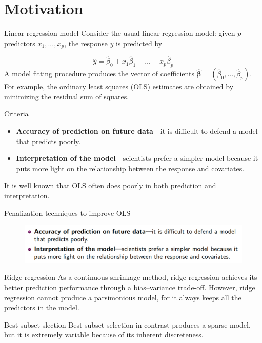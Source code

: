 \section{Motivation}
    \begin{frame}{Linear regression model}
    Consider the usual linear regression model: given $p$ predictors $x_1,..., x_p$, the response $y$ is predicted by
    
    \begin{equation}
\hat{y} = \hat{\beta}_0 + x_1\hat{\beta}_1 + \ldots + x_p\hat{\beta}_p
\end{equation}
\vspace{10pt}
A model fitting procedure produces the vector of coefficients $\hat{\boldsymbol{\beta}}=\left(\hat{\beta}_0,...,\hat{\beta}_p\right)$. For example, the ordinary least squares (OLS) estimates are obtained by minimizing the residual sum of squares.
    \end{frame}

    \begin{frame}{Criteria}
        \begin{itemize}
            \item \textbf{Accuracy of prediction on future data}—it is difficult to defend a model that predicts poorly.
            \item \textbf{Interpretation of the model}—scientists prefer a simpler model because it puts more light on the relationship between the response and covariates.
        \end{itemize}
        \vspace{10pt}
        It is well known that OLS often does poorly in both prediction and interpretation.
    \end{frame}

    \begin{frame}{Penalization techniques to improve OLS}
    
    \begin{figure}
        \centering
        \includegraphics[width=1\textwidth]{img/image4.png}
    \end{figure}
    
    \begin{block}{Ridge regression}
     As a continuous shrinkage method, ridge regression achieves its better prediction performance through a bias–variance trade-off. However, ridge regression cannot produce a parsimonious model, for it always keeps all the predictors in the model.
    \end{block}
    
     \begin{block}{Best subset slection}
         Best subset selection in contrast produces a sparse model, but it is extremely variable because of its inherent discreteness.
     \end{block}
    \end{frame}

